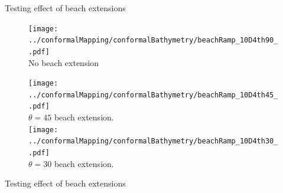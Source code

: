 \documentclass{sintefbeamer}
\renewcommand{\_}[1]{_\mr{#1}}
\newcommand{\x}{x}
\newcommand{\y}{y}
\newcommand{\zz}{\zeta}
\begin{document}
\begin{frame}{Testing effect of beach extensions}
	\begin{figure}[H]
		\vspace{-1cm}
		\begin{minipage}[c]{.45\textwidth}\centering
		\texttt{[image: ../conformalMapping/conformalBathymetry/beachRamp\_h10D4th90\_z.pdf]}\\
		No beach extension
		\end{minipage}%
		\hfill
		\begin{minipage}[c]{.5\textwidth}\centering
			\texttt{[image: ../conformalMapping/conformalBathymetry/beachRamp\_h10D4th45\_z.pdf]}\\
			$\theta=45$\textdegree{} beach extension.\\
			\texttt{[image: ../conformalMapping/conformalBathymetry/beachRamp\_h10D4th30\_z.pdf]}\label{fig:map:30}\\
			$\theta=30$\textdegree{} beach extension.
		\end{minipage}
		\label{fig:maps}
	\end{figure}
\end{frame}




\begin{frame}{Testing effect of beach extensions}
	
	\begin{table}[H]
		\centering
\qquad
		\caption{Rough reflection estimates tabulated against carrier periods and beach extension slopes.}
		\label{tab:results}
	\end{table}
\end{frame}
\end{document}
